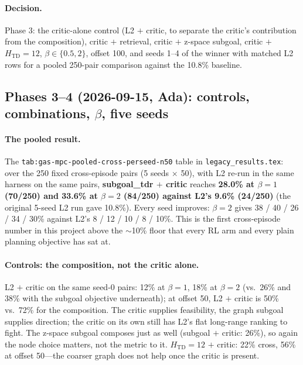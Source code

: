 \documentclass[11pt]{article}
\newcommand{\Htd}{H_{\mathrm{TD}}}
\begin{document}
\paragraph{Decision.} Phase 3: the critic-alone control (L2 $+$ critic, to separate the
critic's contribution from the composition), critic $+$ retrieval, critic $+$ z-space
subgoal, critic $+$ $\Htd=12$, $\beta\in\{0.5,2\}$, offset 100, and seeds 1--4 of the winner
with matched L2 rows for a pooled 250-pair comparison against the 10.8\% baseline.

\subsection{Phases 3--4 (2026-09-15, Ada): controls, combinations, $\beta$, five seeds}
\paragraph{The pooled result.} The \texttt{tab:gas-mpc-pooled-cross-perseed-n50} table in \texttt{legacy\_results.tex}: over the 250 fixed
cross-episode pairs (5 seeds $\times$ 50), with L2 re-run in the same harness on the same
pairs, \textbf{subgoal\_tdr $+$ critic} reaches \textbf{28.0\% at $\beta=1$ (70/250) and
33.6\% at $\beta=2$ (84/250) against L2's 9.6\% (24/250)} (the original 5-seed L2 run gave
10.8\%). Every seed improves: $\beta=2$ gives 38 / 40 / 26 / 34 / 30\% against L2's
8 / 12 / 10 / 8 / 10\%. This is the first cross-episode number in this project above the
$\sim$10\% floor that every RL arm and every plain planning objective has sat at.

\paragraph{Controls: the composition, not the critic alone.} L2 $+$ critic on the same
seed-0 pairs: 12\% at $\beta=1$, 18\% at $\beta=2$ (vs.\ 26\% and 38\% with the subgoal
objective underneath); at offset 50, L2 $+$ critic is 50\% vs.\ 72\% for the composition.
The critic supplies feasibility, the graph subgoal supplies direction; the critic on its own
still has L2's flat long-range ranking to fight. The z-space subgoal composes just as well
(subgoal $+$ critic: 26\%), so again the node choice matters, not the metric to it.
$\Htd=12$ $+$ critic: 22\% cross, 56\% at offset 50---the coarser graph does not help once
the critic is present.
\end{document}
